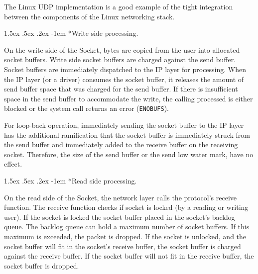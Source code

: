 \documentclass[letterpaper,final,notitlepage,twocolumn,10pt,twoside]{article}
\makeatletter
\renewcommand\paragraph{\@startsection{paragraph}{4}{\z@}%
                                    {1.5ex \@plus .5ex \@minus .2ex}%
                                    {-1em}%
                                    {\normalfont\normalsize\bfseries\slshape}}
\makeatother
\begin{document}
The Linux UDP implementation is a good example of the tight integration
between the components of the Linux networking stack.

\paragraph*{Write side processing.}

On the write side of the Socket, bytes are copied from the user into allocated
socket buffers.  Write side socket buffers are charged against the send
buffer.  Socket buffers are immediately dispatched to the IP layer for
processing.  When the IP layer (or a driver) consumes the socket buffer, it
releases the amount of send buffer space that was charged for the send buffer.
If there is insufficient space in the send buffer to accommodate the write,
the calling processed is either blocked or the system call returns an error
(\texttt{ENOBUFS}).

For loop-back operation, immediately sending the socket buffer to the IP layer
has the additional ramification that the socket buffer is immediately struck
from the send buffer and immediately added to the receive buffer on the
receiving socket.  Therefore, the size of the send buffer or the send low
water mark, have no effect.




\paragraph*{Read side processing.}

On the read side of the Socket, the network layer calls the protocol's receive
function.  The receive function checks if socket is locked (by a reading or
writing user).  If the socket is locked the socket buffer placed in the
socket's backlog queue.  The backlog queue can hold a maximum number of socket
buffers.  If this maximum is exceeded, the packet is dropped.  If the socket
is unlocked, and the socket buffer will fit in the socket's receive buffer,
the socket buffer is charged against the receive buffer.  If the socket buffer
will not fit in the receive buffer, the socket buffer is dropped.
\end{document}
